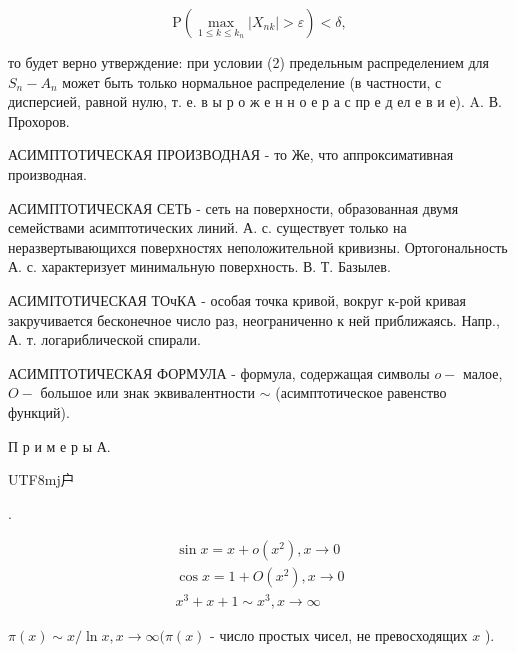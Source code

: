 \documentclass[10pt]{article}
\begin{document}
\[

\mathrm{P}\left(\max _{1 \leqslant k \leqslant k_{n}}\left|X_{n k}\right|>\varepsilon\right)<\delta,

\]



то будет верно утверждение: при условии (2) предельным распределением для $S_{n}-A_{n}$ может быть только нормальное распределение (в частности, с дисперсией, равной нулю, т. е. в ы р о ж е н н о е р а с пр е д ел е в и е). A. В. Прохоров.



АСИМПТОТИЧЕСКАЯ ПРОИЗВОДНАЯ - то Же, что аппроксимативная производная.



АСИМПТОТИЧЕСКАЯ СЕТЬ - сеть на поверхности, образованная двумя семействами асимптотических линий. А. с. существует только на неразвертывающихся поверхностях неположительной кривизны. Ортогональность А. с. характеризует минимальную поверхность. В. Т. Базылев.



АСИМІТОТИЧЕСКАЯ ТОчКА - особая точка кривой, вокруг к-рой кривая закручивается бесконечное число раз, неограниченно к ней приближаясь. Напр., А. т. логариблической спирали.



АСИМПТОТИЧЕСКАЯ ФОРМУЛА - формула, содержащая символы $o-$ малое, $O-$ большое или знак эквивалентности $\sim$ (асимптотическое равенство функций).



П р и м е р ы А. \begin{CJK}{UTF8}{mj}户\end{CJK}.



\[

\begin{gathered}

\sin x=x+o\left(x^{2}\right), x \longrightarrow 0 \\

\cos x=1+O\left(x^{2}\right), x \rightarrow 0 \\

x^{3}+x+1 \sim x^{3}, x \rightarrow \infty

\end{gathered}

\]



$\pi(x) \sim x / \ln x, x \rightarrow \infty(\pi(x)$ - число простых чисел, не превосходящих $x$ ).
\end{document}
